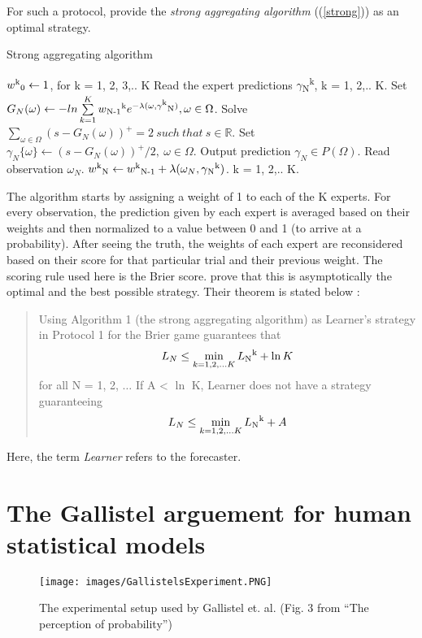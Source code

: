 \documentclass{article}
\begin{document}
For such a protocol, \cite{vovk2009prediction} provide the \textit{strong aggregating algorithm} ((\ref{strong})) as an optimal strategy.

\begin{algorithm}
\caption{Strong aggregating algorithm}\label{strong}
\begin{algorithmic}
\State $w\textsuperscript{k}\textsubscript{0} \leftarrow 1$, for k = 1, 2, 3,.. K
	\State Read the expert predictions $\gamma$\textsubscript{N}\textsuperscript{k}, k = 1, 2,.. K.
	\State Set $G_N(\omega) \leftarrow -ln \sum\limits_{k=1}^K w\textsubscript{N-1}\textsuperscript{k} e^{-\lambda(\omega, \gamma\textsuperscript{k}\textsubscript{N})}, \omega \in \Omega $.
	\State Solve $\sum\nolimits_{\omega \in \Omega} (s - G_N(\omega))^+ = 2\:such\:that\:s \in \mathbb{R}$.
	\State Set $\gamma_N\{\omega\} \leftarrow (s - G_N(\omega))^+/2,\: \omega \in \Omega$.
	\State Output prediction $\gamma_N \in P(\Omega)$.
	\State Read observation $\omega_N$.
	\State $w \textsuperscript{k}\textsubscript{N} \leftarrow  w\textsuperscript{k}\textsubscript{N-1} + \lambda(\omega_N, \gamma \textsubscript{N}	   \textsuperscript{k})$. k = 1, 2,.. K.
\EndFor
\end{algorithmic}
\end{algorithm}

The algorithm starts by assigning a weight of 1 to each of the K experts. For every observation, the prediction given by each expert is averaged based on their weights and then normalized to a value between 0 and 1 (to arrive at a probability). After seeing the truth, the weights of each expert are reconsidered based on their score for that particular trial and their previous weight. The scoring rule used here is the Brier score. \cite{vovk2009prediction} prove that this is asymptotically the optimal and the best possible strategy. Their theorem is stated below :
\begin{quote}
Using Algorithm 1 (the strong aggregating algorithm) as Learner's strategy in Protocol 1 for the Brier game guarantees that
\[ L_N \leq \min_{k = 1, 2, \dots K} L\textsubscript{N}\textsuperscript{k} + \ln K\]
for all N = 1, 2, $\dots$ If A < $\ln$ K, Learner does not have a strategy guaranteeing 
\[ L_N \leq \min_{k = 1, 2, \dots K} L\textsubscript{N}\textsuperscript{k} + A \]
\end{quote}

Here, the term \textit{Learner} refers to the forecaster.

\section{The Gallistel arguement for human statistical models}
\label{perceptionsOfProbability}
\begin{figure}
	\texttt{[image: images/GallistelsExperiment.PNG]}
	\caption{The experimental setup used by Gallistel et. al. (Fig. 3 from ``The perception of probability'')}
	\label{fig:GallistelsStudy}
\end{figure} 
\end{document}
